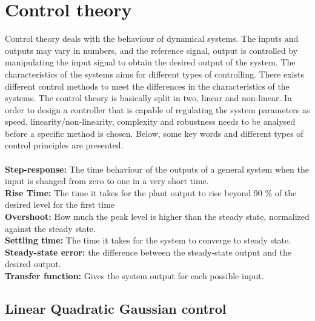 \section{Control theory}
Control theory deals with the behaviour of dynamical systems. The inputs and outputs may vary in numbers, and the reference signal, output is controlled by manipulating the input signal to obtain the desired output of the system. The characteristics of the systems aims for different types of controlling. There exists different control methods to meet the differences in the characteristics of the systems. The control theory is basically split in two, linear and non-linear. In order to design a controller that is capable of regulating the system parameters as speed, linearity/non-linearity, complexity and robustness needs to be analysed before a specific method is chosen. Below, some key words and different types of control principles are presented. \\
\\
\textbf{Step-response:} The time behaviour of the outputs of a general system when the input is changed from zero to one in a very short time. \\
\textbf{Rise Time:} The time it takes for the plant output to rise beyond 90 \% of the desired level for the first time\\
\textbf{Overshoot:} How much the peak level is higher than the steady state, normalized against the steady state.\\ \textbf{Settling time:} The time it takes for the system to converge to steady state.\\
\textbf{Steady-state error:} the difference between the steady-state output and the desired output.\\
\textbf{Transfer function:} Gives the system output for each possible input.\\

\subsection{Linear Quadratic Gaussian control}

